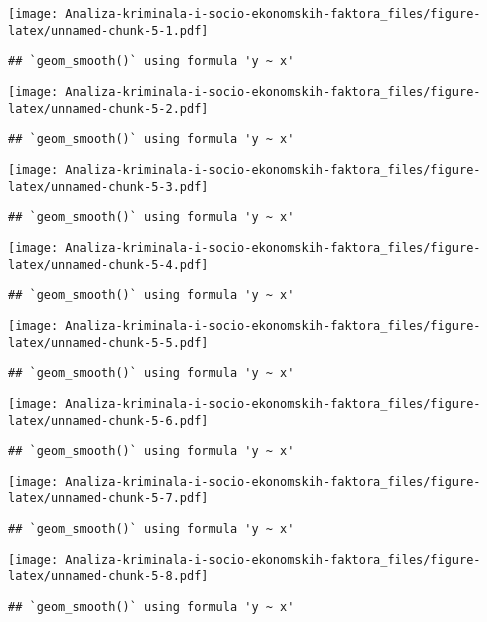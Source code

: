 \documentclass[
]{article}
\begin{document}
\texttt{[image: Analiza-kriminala-i-socio-ekonomskih-faktora\_files/figure-latex/unnamed-chunk-5-1.pdf]}

\begin{verbatim}
## `geom_smooth()` using formula 'y ~ x'
\end{verbatim}

\texttt{[image: Analiza-kriminala-i-socio-ekonomskih-faktora\_files/figure-latex/unnamed-chunk-5-2.pdf]}

\begin{verbatim}
## `geom_smooth()` using formula 'y ~ x'
\end{verbatim}

\texttt{[image: Analiza-kriminala-i-socio-ekonomskih-faktora\_files/figure-latex/unnamed-chunk-5-3.pdf]}

\begin{verbatim}
## `geom_smooth()` using formula 'y ~ x'
\end{verbatim}

\texttt{[image: Analiza-kriminala-i-socio-ekonomskih-faktora\_files/figure-latex/unnamed-chunk-5-4.pdf]}

\begin{verbatim}
## `geom_smooth()` using formula 'y ~ x'
\end{verbatim}

\texttt{[image: Analiza-kriminala-i-socio-ekonomskih-faktora\_files/figure-latex/unnamed-chunk-5-5.pdf]}

\begin{verbatim}
## `geom_smooth()` using formula 'y ~ x'
\end{verbatim}

\texttt{[image: Analiza-kriminala-i-socio-ekonomskih-faktora\_files/figure-latex/unnamed-chunk-5-6.pdf]}

\begin{verbatim}
## `geom_smooth()` using formula 'y ~ x'
\end{verbatim}

\texttt{[image: Analiza-kriminala-i-socio-ekonomskih-faktora\_files/figure-latex/unnamed-chunk-5-7.pdf]}

\begin{verbatim}
## `geom_smooth()` using formula 'y ~ x'
\end{verbatim}

\texttt{[image: Analiza-kriminala-i-socio-ekonomskih-faktora\_files/figure-latex/unnamed-chunk-5-8.pdf]}

\begin{verbatim}
## `geom_smooth()` using formula 'y ~ x'
\end{verbatim}
\end{document}
